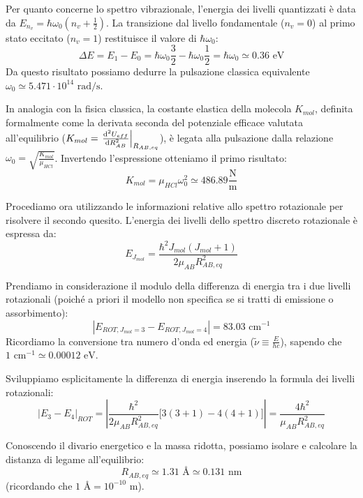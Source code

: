 \begin{exercise}
\begin{solution}
    Per quanto concerne lo spettro vibrazionale, l'energia dei livelli quantizzati è data da \( E_{n_v} = \hbar\omega_0 \left( n_v + \frac{1}{2} \right) \). La transizione dal livello fondamentale (\( n_v = 0 \)) al primo stato eccitato (\( n_v = 1 \)) restituisce il valore di \(\hbar\omega_0\):
    \begin{equation}
        \Delta E = E_1 - E_0 = \hbar\omega_0 \frac{3}{2} - \hbar\omega_0 \frac{1}{2} = \hbar\omega_0 \simeq 0.36 \text{ eV}
    \end{equation}
    Da questo risultato possiamo dedurre la pulsazione classica equivalente \( \omega_0 \simeq 5.471 \cdot 10^{14} \text{ rad/s} \).

    In analogia con la fisica classica, la costante elastica della molecola \( K_{mol} \), definita formalmente come la derivata seconda del potenziale efficace valutata all'equilibrio (\( K_{mol} = \left. \dv[2]{U_{eff}}{R_{AB}} \right|_{R_{AB,eq}} \)), è legata alla pulsazione dalla relazione \( \omega_0 = \sqrt{\frac{K_{mol}}{\mu_{HCl}}} \). Invertendo l'espressione otteniamo il primo risultato:
    \begin{equation}
        K_{mol} = \mu_{HCl} \omega_0^2 \simeq 486.89 \frac{\text{N}}{\text{m}}
    \end{equation}

    Procediamo ora utilizzando le informazioni relative allo spettro rotazionale per risolvere il secondo quesito. L'energia dei livelli dello spettro discreto rotazionale è espressa da:
    \begin{equation}
        E_{J_{mol}} = \frac{\hbar^2 J_{mol}(J_{mol}+1)}{2\mu_{AB} R_{AB,eq}^2}
    \end{equation}
    
    Prendiamo in considerazione il modulo della differenza di energia tra i due livelli rotazionali (poiché a priori il modello non specifica se si tratti di emissione o assorbimento):
    \begin{equation}
        |E_{ROT, J_{mol}=3} - E_{ROT, J_{mol}=4}| = 83.03 \text{ cm}^{-1}
    \end{equation}
    Ricordiamo la conversione tra numero d'onda ed energia (\( \tilde{\nu} \equiv \frac{E}{hc} \)), sapendo che \( 1 \text{ cm}^{-1} \simeq 0.00012 \text{ eV} \).
    
    Sviluppiamo esplicitamente la differenza di energia inserendo la formula dei livelli rotazionali:
    \begin{equation}
        |E_3 - E_4|_{ROT} = \left| \frac{\hbar^2}{2\mu_{AB} R_{AB,eq}^2} \big[ 3(3+1) - 4(4+1) \big] \right| = \frac{4\hbar^2}{\mu_{AB} R_{AB,eq}^2}
    \end{equation}

    Conoscendo il divario energetico e la massa ridotta, possiamo isolare e calcolare la distanza di legame all'equilibrio:
    \begin{equation}
        R_{AB,eq} \simeq 1.31 \text{ \AA} \simeq 0.131 \text{ nm}
    \end{equation}
    (ricordando che \( 1 \text{ \AA} = 10^{-10} \text{ m} \)).
\end{solution}
\end{exercise}

